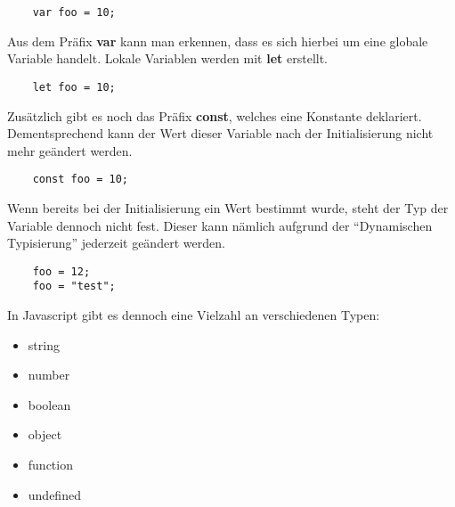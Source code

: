 \begin{lstlisting}
    var foo = 10;
\end{lstlisting}

Aus dem Präfix \textbf{var} kann man erkennen, dass es sich hierbei um eine globale Variable handelt. Lokale Variablen werden mit \textbf{let} erstellt.

\begin{lstlisting}
    let foo = 10;
\end{lstlisting}

Zusätzlich gibt es noch das Präfix \textbf{const}, welches eine Konstante deklariert. Dementsprechend kann der Wert dieser Variable nach der Initialisierung nicht mehr geändert werden.

\begin{lstlisting}
    const foo = 10;
\end{lstlisting}

Wenn bereits bei der Initialisierung ein Wert bestimmt wurde, steht der Typ der Variable dennoch nicht fest. Dieser kann nämlich aufgrund der “Dynamischen Typisierung” jederzeit geändert werden.

\begin{lstlisting}
    foo = 12;
    foo = "test";
\end{lstlisting}

In Javascript gibt es dennoch eine Vielzahl an verschiedenen Typen:

\begin{itemize}
  \item string
  \item number
  \item boolean
  \item object
  \item function
  \item undefined
\end{itemize}

\cite{frontend_web_javascript}
